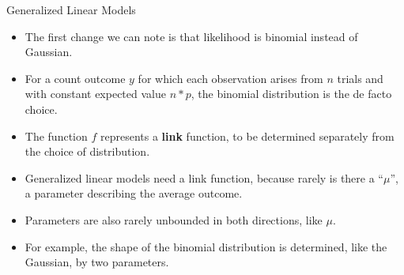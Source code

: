 \documentclass[handout]{beamer}
\begin{document}
\begin{frame}{Generalized Linear Models}
\scriptsize{
\begin{itemize}


\item  The first change we can note is that likelihood is binomial instead of Gaussian.
\item For a count outcome $y$ for which each observation arises from $n$ trials and with constant expected value $n*p$, the binomial distribution is the de facto choice.

\item The function $f$ represents a \textbf{link} function, to be determined separately from the choice of distribution.

\item Generalized linear models need a link function, because rarely is there a ``$\mu$'', a parameter describing the average outcome.
\item Parameters are also rarely unbounded in both directions, like $\mu$.
\item For example, the shape of the binomial distribution is determined, like the Gaussian, by two parameters.
\end{itemize}



}

\end{frame}
\end{document}

